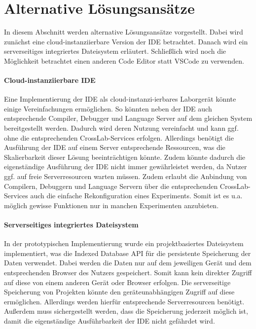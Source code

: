 \section{Alternative Lösungsansätze}\label{section:diskussion:alternative-lösungsansätze}

In diesem Abschnitt werden alternative Lösungsansätze vorgestellt. Dabei wird zunächst eine cloud-instanziierbare Version der IDE betrachtet. Danach wird ein serverseitiges integriertes Dateisystem erläutert. Schließlich wird noch die Möglichkeit betrachtet einen anderen Code Editor statt \ac{VSCode} zu verwenden.

\paragraph{Cloud-instanziierbare IDE}
Eine Implementierung der IDE als cloud-instanzi-ierbares Laborgerät könnte einige Vereinfachungen ermöglichen. So könnten neben der IDE auch entsprechende Compiler, Debugger und Language Server auf dem gleichen System bereitgestellt werden. Dadurch wird deren Nutzung vereinfacht und kann ggf. ohne die entsprechenden CrossLab-Services erfolgen. Allerdings benötigt die Ausführung der IDE auf einem Server entsprechende Ressourcen, was die Skalierbarkeit dieser Lösung beeinträchtigen könnte. Zudem könnte dadurch die eigenständige Ausführung der IDE nicht immer gewährleistet werden, da Nutzer ggf. auf freie Serverresourcen warten müssen. Zudem erlaubt die Anbindung von Compilern, Debuggern und Language Servern über die entsprechenden CrossLab-Services auch die einfache Rekonfiguration eines Experiments. Somit ist es u.a. möglich gewisse Funktionen nur in manchen Experimenten anzubieten.

\paragraph{Serverseitiges integriertes Dateisystem}
In der prototypischen Implementierung wurde ein projektbasiertes Dateisystem implementiert, was die Indexed Database API für die persistente Speicherung der Daten verwendet. Dabei werden die Daten nur auf dem jeweiligen Gerät und dem entsprechenden Browser des Nutzers gespeichert. Somit kann kein direkter Zugriff auf diese von einem anderen Gerät oder Browser erfolgen. Die serverseitige Speicherung von Projekten könnte den geräteunabhängigen Zugriff auf diese ermöglichen. Allerdings werden hierfür entsprechende Serverresourcen benötigt. Außerdem muss sichergestellt werden, dass die Speicherung jederzeit möglich ist, damit die eigenständige Ausführbarkeit der IDE nicht gefährdet wird.

